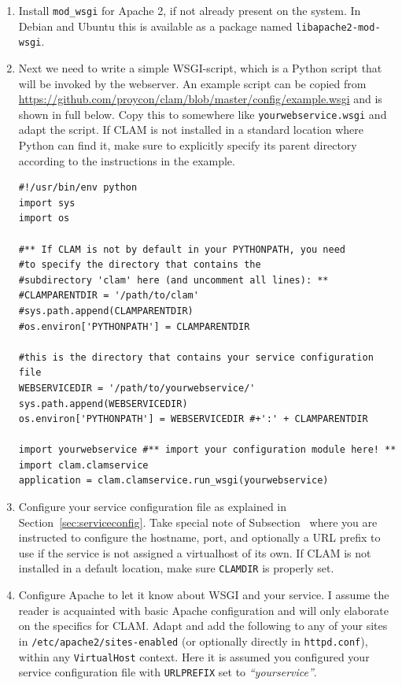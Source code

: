 \documentclass[a4paper,12pt]{report}
\begin{document}
\begin{enumerate}
    \item Install \texttt{mod\_wsgi} for Apache 2, if not already
    present on the system. In Debian and Ubuntu this is available as a package
    named \texttt{libapache2-mod-wsgi}.  
  
    \item Next we need to write a simple
    WSGI-script, which is a Python script that will be invoked by the
    webserver. An example script can be copied from
    \url{https://github.com/proycon/clam/blob/master/config/example.wsgi} and
    is shown in full below. Copy this to somewhere like
    \texttt{yourwebservice.wsgi} and adapt the script. If CLAM is not installed in a standard location
    where Python can find it, make sure to explicitly specify its parent
    directory according to the instructions in the example.

\begin{verbatim}
#!/usr/bin/env python
import sys
import os

#** If CLAM is not by default in your PYTHONPATH, you need 
#to specify the directory that contains the
#subdirectory 'clam' here (and uncomment all lines): **
#CLAMPARENTDIR = '/path/to/clam' 
#sys.path.append(CLAMPARENTDIR)
#os.environ['PYTHONPATH'] = CLAMPARENTDIR

#this is the directory that contains your service configuration file
WEBSERVICEDIR = '/path/to/yourwebservice/' 
sys.path.append(WEBSERVICEDIR)
os.environ['PYTHONPATH'] = WEBSERVICEDIR #+':' + CLAMPARENTDIR

import yourwebservice #** import your configuration module here! **
import clam.clamservice
application = clam.clamservice.run_wsgi(yourwebservice)
\end{verbatim}
 
\item Configure your service configuration file as explained in
  Section~\ref{sec:serviceconfig}. Take special note of
  Subsection~\label{sec:sadmin} where you are instructed to configure the
  hostname, port, and optionally a URL prefix to use if the service is not
  assigned a virtualhost of its own. If CLAM is not installed in a default
  location, make sure \texttt{CLAMDIR} is properly set.
\item Configure Apache to let it know about WSGI and your service. I assume the
  reader is acquainted with basic Apache configuration and will only elaborate
  on the specifics for CLAM. Adapt and add the following to any of your sites
  in \texttt{/etc/apache2/sites-enabled} (or optionally directly in
  \texttt{httpd.conf}), within any \texttt{VirtualHost} context. Here it is
  assumed you configured your service configuration file with
  \texttt{URLPREFIX} set to \emph{``yourservice''}.


\end{enumerate}
\end{document}
